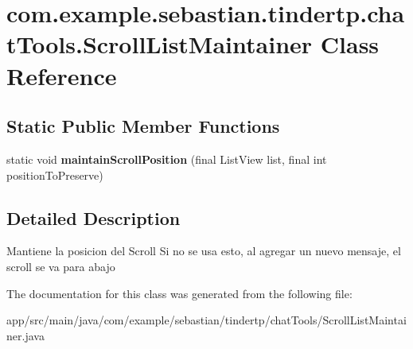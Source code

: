 \hypertarget{classcom_1_1example_1_1sebastian_1_1tindertp_1_1chatTools_1_1ScrollListMaintainer}{}\section{com.\+example.\+sebastian.\+tindertp.\+chat\+Tools.\+Scroll\+List\+Maintainer Class Reference}
\label{classcom_1_1example_1_1sebastian_1_1tindertp_1_1chatTools_1_1ScrollListMaintainer}
\subsection*{Static Public Member Functions}
\begin{DoxyCompactItemize}
\item 
static void {\bfseries maintain\+Scroll\+Position} (final List\+View list, final int position\+To\+Preserve)\hypertarget{classcom_1_1example_1_1sebastian_1_1tindertp_1_1chatTools_1_1ScrollListMaintainer_a4ac4f892279b9b812b49b727ec4b7361}{}\label{classcom_1_1example_1_1sebastian_1_1tindertp_1_1chatTools_1_1ScrollListMaintainer_a4ac4f892279b9b812b49b727ec4b7361}

\end{DoxyCompactItemize}


\subsection{Detailed Description}
Mantiene la posicion del Scroll Si no se usa esto, al agregar un nuevo mensaje, el scroll se va para abajo 

The documentation for this class was generated from the following file\+:\begin{DoxyCompactItemize}
\item 
app/src/main/java/com/example/sebastian/tindertp/chat\+Tools/Scroll\+List\+Maintainer.\+java\end{DoxyCompactItemize}
